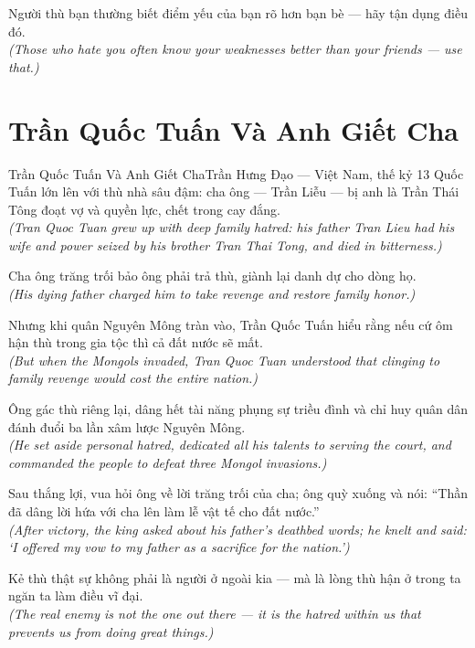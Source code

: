 \begin{baihoc}
  Người thù bạn thường biết điểm yếu của bạn rõ hơn bạn bè --- hãy tận dụng điều đó.\\[4pt]
  \textit{(Those who hate you often know your weaknesses better than your friends --- use that.)}
\end{baihoc}

\section{Trần Quốc Tuấn Và Anh Giết Cha}
\begin{truyen}{Trần Quốc Tuấn Và Anh Giết Cha}{Trần Hưng Đạo --- Việt Nam, thế kỷ 13}
 Quốc Tuấn lớn lên với thù nhà sâu đậm: cha ông --- Trần Liễu --- bị anh là Trần Thái Tông đoạt vợ và quyền lực, chết trong cay đắng.\\[4pt]
\textit{(Tran Quoc Tuan grew up with deep family hatred: his father Tran Lieu had his wife and power seized by his brother Tran Thai Tong, and died in bitterness.)}

Cha ông trăng trối bảo ông phải trả thù, giành lại danh dự cho dòng họ.\\[4pt]
\textit{(His dying father charged him to take revenge and restore family honor.)}

Nhưng khi quân Nguyên Mông tràn vào, Trần Quốc Tuấn hiểu rằng nếu cứ ôm hận thù trong gia tộc thì cả đất nước sẽ mất.\\[4pt]
\textit{(But when the Mongols invaded, Tran Quoc Tuan understood that clinging to family revenge would cost the entire nation.)}

Ông gác thù riêng lại, dâng hết tài năng phụng sự triều đình và chỉ huy quân dân đánh đuổi ba lần xâm lược Nguyên Mông.\\[4pt]
\textit{(He set aside personal hatred, dedicated all his talents to serving the court, and commanded the people to defeat three Mongol invasions.)}

Sau thắng lợi, vua hỏi ông về lời trăng trối của cha; ông quỳ xuống và nói: ``Thần đã dâng lời hứa với cha lên làm lễ vật tế cho đất nước.''\\[4pt]
\textit{(After victory, the king asked about his father's deathbed words; he knelt and said: `I offered my vow to my father as a sacrifice for the nation.')}

\end{truyen}
\begin{baihoc}
  Kẻ thù thật sự không phải là người ở ngoài kia --- mà là lòng thù hận ở trong ta ngăn ta làm điều vĩ đại.\\[4pt]
  \textit{(The real enemy is not the one out there --- it is the hatred within us that prevents us from doing great things.)}
\end{baihoc}

